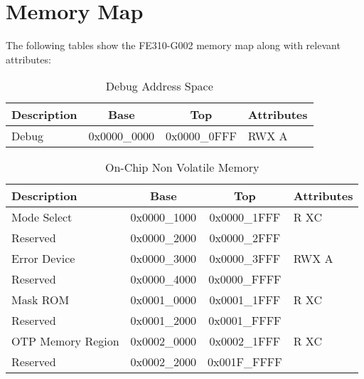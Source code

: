 \documentclass[a4paper,12pt,twoside]{report}
\begin{document}
            \section{Memory Map}
            	The following tables show the FE310-G002 memory map along with relevant attributes:\cite{fe310g002manMMap}

            	\begin{table}[H]
            		\centering
            		\begin{tabular}{| p{3cm} | c | c | p{3cm} |}
            			\hline
            			\textbf{Description} & \textbf{Base} & \textbf{Top} & \textbf{Attributes}\\
            			\hline
            			\hline
            			Debug & 0x0000\_0000 & 0x0000\_0FFF & RWX A\\
            			\hline
            		\end{tabular}
            		\caption{Debug Address Space}
            	\end{table}

            	\begin{table}[H]
            		\centering
            		\begin{tabular}{| p{4cm} | c | c | p{3cm} |}
            			\hline
            			\textbf{Description} & \textbf{Base} & \textbf{Top} & \textbf{Attributes}\\
            			\hline
            			Mode Select & 0x0000\_1000 & 0x0000\_1FFF & R XC\\
            			Reserved & 0x0000\_2000 & 0x0000\_2FFF & \\
            			Error Device & 0x0000\_3000 & 0x0000\_3FFF & RWX A\\
            			Reserved & 0x0000\_4000 & 0x0000\_FFFF & \\
            			Mask ROM & 0x0001\_0000 & 0x0001\_1FFF & R XC\\
            			Reserved & 0x0001\_2000 & 0x0001\_FFFF & \\
            			OTP Memory Region & 0x0002\_0000 & 0x0002\_1FFF & R XC\\
            			Reserved & 0x0002\_2000 & 0x001F\_FFFF & \\
            			\hline
            		\end{tabular}
            		\caption{On-Chip Non Volatile Memory}
            	\end{table}
\end{document}
